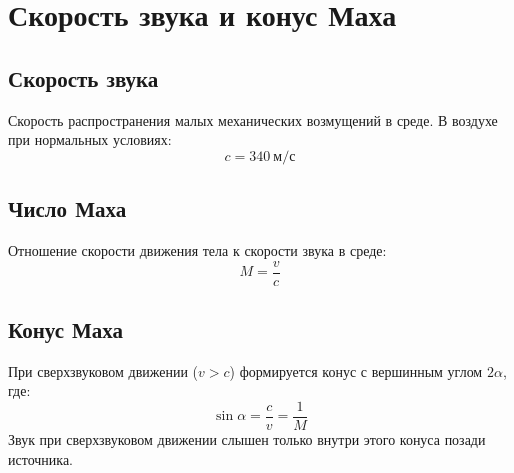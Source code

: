 \documentclass[12pt]{article}
\begin{document}
\section*{Скорость звука и конус Маха}

\subsection*{Скорость звука}
Скорость распространения малых механических возмущений в среде. В воздухе при нормальных условиях:
\[ c = 340\ \mathrm{м/с} \]

\subsection*{Число Маха}
Отношение скорости движения тела к скорости звука в среде:
\[ M = \frac{v}{c} \]

\subsection*{Конус Маха}
При сверхзвуковом движении ($v>c$) формируется конус с вершинным углом $2\alpha$, где:
\[ \sin\alpha = \frac{c}{v} = \frac{1}{M} \]
Звук при сверхзвуковом движении слышен только внутри этого конуса позади источника.
\end{document}
